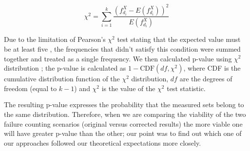 \documentclass[
	digital,    %
	oneside,    %
	color,
	11pt,
	nocover,
	notable,
	nolof,
	nolot,
]{fithesis3}
\theoremstyle{definition}
\theoremstyle{remark}
\begin{document}
\begin{equation}
\label{eq:chi_square_stat}
\chi^2 = \sum\limits_{i=1}^{k} \frac{  \left(f_{d_i}^{X} - E \left(f_{d_i}^{X}\right) \right)^2 }{E \left(f_{d_i}^{X}\right)}
\end{equation}

Due to the limitation of Pearson's $\chi^2$ test stating that the expected value must be at least five \cite[p.~220]{stat-handbook}, the frequencies that didn't satisfy this condition were summed together and treated as a single frequency. We then calculated p-value using $\chi^2$ distribution \cite[p.~116]{stat-handbook}; the p-value is calculated as $1 - \text{CDF}(df, \chi^2)$, where CDF is the cumulative distribution function of the $\chi^2$ distribution, $df$ are the degrees of freedom (equal to $k-1$) and $\chi^2$ is the value of the $\chi^2$ test statistic.

The resulting p-value expresses the probability that the measured sets belong to the same distribution. Therefore, when we are comparing the viability of the two failure counting scenarios (original versus corrected results) the more viable one will have greater p-value than the other; our point was to find out which one of our approaches followed our theoretical expectations more closely.
\end{document}
